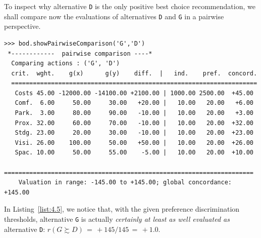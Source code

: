 To inspect why alternative \texttt{D} is the only positive best choice recommendation, we shall compare now the evaluations of alternatives \texttt{D} and \texttt{G} in a pairwise perspective.
\begin{lstlisting}[caption={Inspecting pairwise comparison between alternatives \texttt{G} and \texttt{D}},label=list:4.5,basicstyle=\ttfamily\scriptsize]
>>> bod.showPairwiseComparison('G','D')
 *------------  pairwise comparison ----*
  Comparing actions : ('G', 'D')
  crit.  wght.    g(x)      g(y)    diff.  |   ind.    pref.  concord. 
  ====================================================================
   Costs 45.00 -12000.00 -14100.00 +2100.00 | 1000.00 2500.00  +45.00  
   Comf.  6.00     50.00     30.00   +20.00 |   10.00   20.00   +6.00 
   Park.  3.00     80.00     90.00   -10.00 |   10.00   20.00   +3.00 
   Prox. 32.00     60.00     70.00   -10.00 |   10.00   20.00  +32.00 
   Stdg. 23.00     20.00     30.00   -10.00 |   10.00   20.00  +23.00 
   Visi. 26.00    100.00     50.00   +50.00 |   10.00   20.00  +26.00 
   Spac. 10.00     50.00     55.00    -5.00 |   10.00   20.00  +10.00
   =====================================================================
    Valuation in range: -145.00 to +145.00; global concordance: +145.00
\end{lstlisting}

In Listing~\vref{list:4.5}, we notice that, with the given preference discrimination thresholds, alternative \texttt{G} is actually \emph{certainly at least as well evaluated as} alternative \texttt{D}:  $r(G \succsim D)\, = \, +145/145\, =\, +1.0$.

